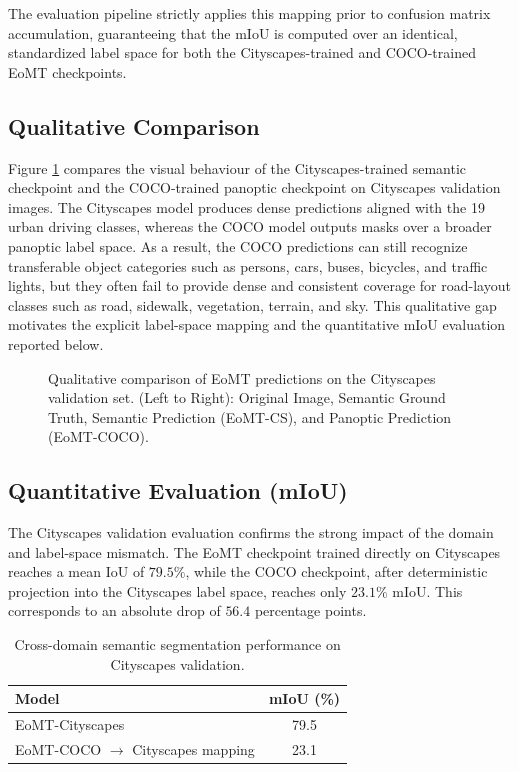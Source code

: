 \documentclass[10pt,conference]{IEEEtran}
\begin{document}
The evaluation pipeline strictly applies this mapping prior to confusion matrix accumulation, guaranteeing that the mIoU is computed over an identical, standardized label space for both the Cityscapes-trained and COCO-trained EoMT checkpoints.

\subsection{Qualitative Comparison}
Figure \ref{fig:qualitative} compares the visual behaviour of the Cityscapes-trained semantic checkpoint and the COCO-trained panoptic checkpoint on Cityscapes validation images. The Cityscapes model produces dense predictions aligned with the 19 urban driving classes, whereas the COCO model outputs masks over a broader panoptic label space. As a result, the COCO predictions can still recognize transferable object categories such as persons, cars, buses, bicycles, and traffic lights, but they often fail to provide dense and consistent coverage for road-layout classes such as road, sidewalk, vegetation, terrain, and sky. This qualitative gap motivates the explicit label-space mapping and the quantitative mIoU evaluation reported below.

\begin{figure}[h]
    \centering
    \vspace{3cm} %
    \caption{Qualitative comparison of EoMT predictions on the Cityscapes validation set. (Left to Right): Original Image, Semantic Ground Truth, Semantic Prediction (EoMT-CS), and Panoptic Prediction (EoMT-COCO).}
    \label{fig:qualitative}
\end{figure}

\subsection{Quantitative Evaluation (mIoU)}
The Cityscapes validation evaluation confirms the strong impact of the domain and label-space mismatch. The EoMT checkpoint trained directly on Cityscapes reaches a mean IoU of $79.5\%$, while the COCO checkpoint, after deterministic projection into the Cityscapes label space, reaches only $23.1\%$ mIoU. This corresponds to an absolute drop of $56.4$ percentage points.

\begin{table}[h]
\centering
\caption{Cross-domain semantic segmentation performance on Cityscapes validation.}
\label{tab:cross_domain_miou}
\begin{tabular}{lc}
\toprule
\textbf{Model} & \textbf{mIoU (\%)} \\
\midrule
EoMT-Cityscapes & 79.5 \\
EoMT-COCO $\rightarrow$ Cityscapes mapping & 23.1 \\
\bottomrule
\end{tabular}
\end{table}
\end{document}
